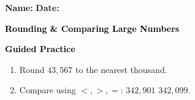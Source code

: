 \documentclass[12pt, letterpaper, fleqn]{article}
\newcommand{\blank}{\underline{\hspace{2.2cm}}}
\begin{document}
\textbf{Name:} \underline{\hspace{5cm}}
\hfill
\textbf{Date:} \underline{\hspace{3cm}}\\

\begin{tcolorbox}[colback=customteal!20]
    \large\textcolor{black}{\textbf{Rounding & Comparing Large Numbers}}
\end{tcolorbox}
\newpage
\begin{tcolorbox}[colback=customteal!20]
    \large\textcolor{black}{\textbf{Guided Practice}}
\end{tcolorbox}
\begin{enumerate}[itemsep=3.5cm, leftmargin=0.6cm]
\item Round $43,567$ to the nearest thousand.
\vspace{3cm}
\item Compare using $<, >, =$: $342,901$ \blank $342,099$.
\end{enumerate}
\end{document}
